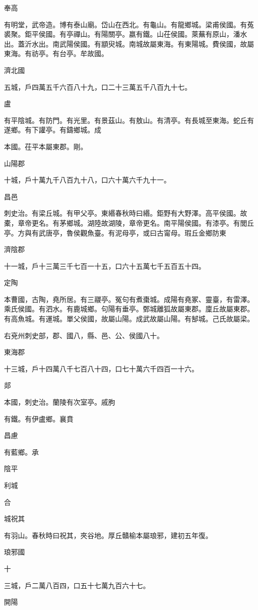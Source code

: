 \begin{pinyinscope}
奉高

有明堂，武帝造。博有泰山廟。岱山在西北。有龜山。有龍鄉城。梁甫侯國。有菟裘聚。鉅平侯國。有亭禪山。有陽關亭。嬴有鐵。山茌侯國。萊蕪有原山，潘水出。蓋沂水出。南武陽侯國。有顓臾城。南城故屬東海。有東陽城。費侯國，故屬東海。有祊亭。有台亭。牟故國。

濟北國

五城，戶四萬五千六百八十九，口二十三萬五千八百九十七。

盧

有平陰城。有防門。有光里。有景茲山。有敖山。有清亭。有長城至東海。蛇丘有遂鄉。有下讙亭。有鑄鄉城。成

本國。茌平本屬東郡。剛。

山陽郡

十城，戶十萬九千八百九十八，口六十萬六千九十一。

昌邑

刺史治。有梁丘城。有甲父亭。東緡春秋時曰緡。鉅野有大野澤。高平侯國。故橐，章帝更名。有茅鄉城。湖陸故湖陵，章帝更名。南平陽侯國。有漆亭。有閭丘亭。方與有武唐亭，魯侯觀魚臺。有泥母亭，或曰古甯母。瑕丘金鄉防東

濟陰郡

十一城，戶十三萬三千七百一十五，口六十五萬七千五百五十四。

定陶

本曹國，古陶，堯所居。有三鬷亭。冤句有煮棗城。成陽有堯冢、靈臺，有雷澤。乘氏侯國。有泗水。有鹿城鄉。句陽有垂亭。鄄城離狐故屬東郡。廩丘故屬東郡。有高魚城。有運城。單父侯國，故屬山陽。成武故屬山陽。有郜城。己氏故屬梁。

右兗州刺史部，郡、國八，縣、邑、公、侯國八十。

東海郡

十三城，戶十四萬八千七百八十四，口七十萬六千四百一十六。

郯

本國，刺史治。蘭陵有次室亭。戚朐

有鐵。有伊盧鄉。襄賁

昌慮

有藍鄉。承

陰平

利城

合

城祝其

有羽山。春秋時曰祝其，夾谷地。厚丘贛榆本屬琅邪，建初五年復。

琅邪國

十

三城，戶二萬八百四，口五十七萬九百六十七。

開陽


\end{pinyinscope}
